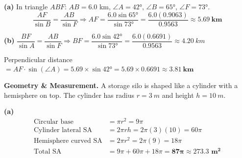 \documentclass[addpoints]{exam}
\begin{document}
\begin{questions}
\begin{solution}[9cm]
\textbf{(a)} In triangle $ABF$: $AB = 6.0$ km, $\angle A = \ang{42}$, $\angle B = \ang{65}$, $\angle F = \ang{73}$.
\[
\frac{AF}{\sin B} = \frac{AB}{\sin F} \Rightarrow AF = \frac{6.0 \sin\ang{65}}{\sin\ang{73}}
= \frac{6.0(0.9063)}{0.9563} \approx \mathbf{\SI{5.69}{km}}
\]

\textbf{(b)} $\dfrac{BF}{\sin A} = \dfrac{AB}{\sin F} \Rightarrow BF = \dfrac{6.0\sin\ang{42}}{\sin\ang{73}}
= \dfrac{6.0(0.6691)}{0.9563} \approx \SI{4.20}{km}$

Perpendicular distance $= AF \cdot \sin(\angle A) = 5.69 \times \sin\ang{42} = 5.69 \times 0.6691 \approx \mathbf{\SI{3.81}{km}}$
\end{solution}

\question[8] \textbf{Geometry \& Measurement.}
A storage silo is shaped like a cylinder with a hemisphere on top. The cylinder has radius
$r = \SI{3}{m}$ and height $h = \SI{10}{m}$.
\begin{solution}[10cm]
\textbf{(a)}
\begin{align*}
\text{Circular base} &= \pi r^2 = 9\pi\\
\text{Cylinder lateral SA} &= 2\pi r h = 2\pi(3)(10) = 60\pi\\
\text{Hemisphere curved SA} &= 2\pi r^2 = 2\pi(9) = 18\pi\\
\text{Total SA} &= 9\pi + 60\pi + 18\pi = \mathbf{87\pi \approx 273.3 \text{ m}^2}
\end{align*}


\end{solution}
\end{questions}
\end{document}
